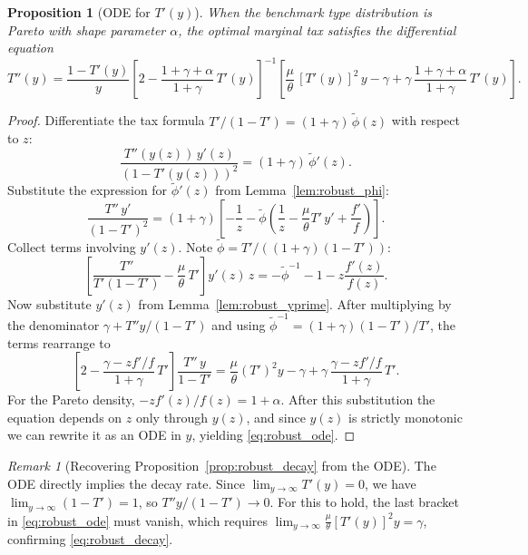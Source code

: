 \documentclass[12pt,a4paper]{article}
\theoremstyle{definition}
\theoremstyle{plain}
\newtheorem{proposition}{Proposition}[section]
\theoremstyle{remark}
\newtheorem{remark}{Remark}[section]
\begin{document}
\begin{proposition}[ODE for $T'(y)$]
\label{prop:robust_ode}
When the benchmark type distribution is Pareto with shape parameter $\alpha$, the optimal marginal tax satisfies the differential equation
\begin{equation}
\label{eq:robust_ode}
  T''(y) = \frac{1 - T'(y)}{y}
  \left[2 - \frac{1+\gamma+\alpha}{1+\gamma}\, T'(y)\right]^{-1}
  \left[\frac{\mu}{\theta}\, [T'(y)]^2\, y - \gamma + \gamma\, \frac{1+\gamma+\alpha}{1+\gamma}\, T'(y)\right].
\end{equation}
\end{proposition}

\begin{proof}
Differentiate the tax formula $T'/(1-T') = (1+\gamma)\,\widetilde{\phi}(z)$ with respect to $z$:
\begin{equation}
\label{eq:robust_ode_step1}
  \frac{T''(y(z))\, y'(z)}{(1 - T'(y(z)))^2} = (1+\gamma)\, \widetilde{\phi}'(z).
\end{equation}
Substitute the expression for $\widetilde{\phi}'(z)$ from Lemma~\ref{lem:robust_phi}:
\[
  \frac{T''\, y'}{(1-T')^2}
  = (1+\gamma)\left[-\frac{1}{z} - \widetilde{\phi}\!\left(\frac{1}{z} - \frac{\mu}{\theta}T'\, y' + \frac{f'}{f}\right)\right].
\]
Collect terms involving $y'(z)$. Note $\widetilde{\phi} = T'/((1+\gamma)(1-T'))$:
\begin{equation}
\label{eq:robust_ode_step2}
  \left[\frac{T''}{T'(1-T')} - \frac{\mu}{\theta}\, T'\right] y'(z)\, z
  = -\widetilde{\phi}^{-1} - 1 - z\frac{f'(z)}{f(z)}.
\end{equation}
Now substitute $y'(z)$ from Lemma~\ref{lem:robust_yprime}. After multiplying by the denominator $\gamma + T''y/(1-T')$ and using $\widetilde{\phi}^{-1} = (1+\gamma)(1-T')/T'$, the terms rearrange to
\[
  \left[2 - \frac{\gamma - zf'/f}{1+\gamma}\, T'\right]\frac{T''\, y}{1-T'}
  = \frac{\mu}{\theta}(T')^2 y - \gamma + \gamma\, \frac{\gamma - zf'/f}{1+\gamma}\, T'.
\]
For the Pareto density, $-zf'(z)/f(z) = 1 + \alpha$. After this substitution the equation depends on $z$ only through $y(z)$, and since $y(z)$ is strictly monotonic we can rewrite it as an ODE in $y$, yielding \eqref{eq:robust_ode}.
\end{proof}

\begin{remark}[Recovering Proposition~\ref{prop:robust_decay} from the ODE]
The ODE directly implies the decay rate. Since $\lim_{y \to \infty} T'(y) = 0$, we have $\lim_{y \to \infty}(1-T') = 1$, so $T''y/(1-T') \to 0$. For this to hold, the last bracket in \eqref{eq:robust_ode} must vanish, which requires $\lim_{y \to \infty} \frac{\mu}{\theta}[T'(y)]^2 y = \gamma$, confirming \eqref{eq:robust_decay}.
\end{remark}
\end{document}
